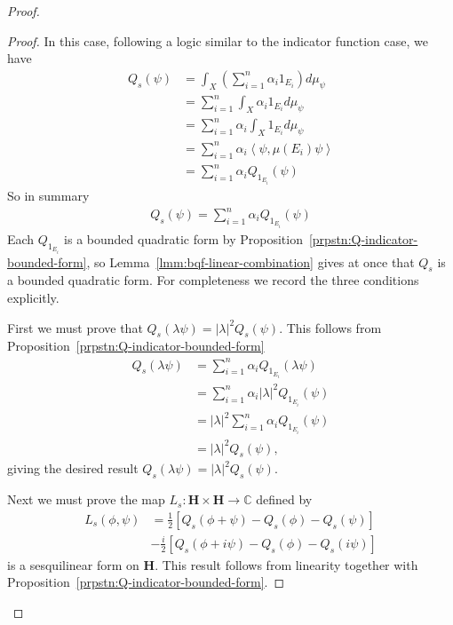 \begin{proof}
\begin{proof}
In this case, following a logic similar to the indicator function case, we have
\begin{align}
    Q_s(\psi) &= \int_X \left( \sum_{i = 1}^n \alpha_i 1_{E_i} \right) d\mu_\psi \\
              &= \sum_{i = 1}^n \int_X \alpha_i 1_{E_i} d\mu_\psi \\
              &= \sum_{i = 1}^n \alpha_i  \int_X 1_{E_i} d\mu_\psi \\
              &= \sum_{i = 1}^n \alpha_i  \left< \psi, \mu(E_i) \psi \right> \\
              &= \sum_{i = 1}^n \alpha_i  Q_{1_{E_i}}(\psi)
\end{align}
So in summary
\begin{align}
    Q_s(\psi) = \sum_{i = 1}^n \alpha_i  Q_{1_{E_i}}(\psi)
\end{align}
Each $Q_{1_{E_i}}$ is a bounded quadratic form by Proposition~\ref{prpstn:Q-indicator-bounded-form}, so Lemma~\ref{lmm:bqf-linear-combination} gives at once that $Q_s$ is a bounded quadratic form. For completeness we record the three conditions explicitly.

First we must prove that $Q_s(\lambda\psi) = \lvert\lambda\rvert^2 Q_s(\psi)$. This follows from Proposition~\ref{prpstn:Q-indicator-bounded-form}
\begin{align}
    Q_s(\lambda\psi) &= \sum_{i = 1}^n \alpha_i Q_{1_{E_i}}(\lambda\psi) \\
                     &= \sum_{i = 1}^n \alpha_i \lvert \lambda \rvert^2 Q_{1_{E_i}}(\psi) \\
                     &= \lvert \lambda \rvert^2 \sum_{i = 1}^n \alpha_i Q_{1_{E_i}}(\psi) \\
                     &= \lvert \lambda \rvert^2 Q_s(\psi),
\end{align}
giving the desired result $Q_s(\lambda\psi) = \lvert\lambda\rvert^2 Q_s(\psi)$.

Next we must prove the map $L_s : \mathbf{H} \times \mathbf{H} \rightarrow \mathbb{C}$ defined by
\begin{align}
    L_s(\phi, \psi) &= \frac{1}{2} \left[ Q_s(\phi + \psi) - Q_s(\phi) - Q_s(\psi) \right] \\
                    &-\frac{i}{2} \left[ Q_s(\phi + i\psi) - Q_s(\phi) - Q_s(i\psi) \right]
\end{align}
is a sesquilinear form on $\mathbf{H}$. This result follows from linearity together with Proposition~\ref{prpstn:Q-indicator-bounded-form}.


\end{proof}
\end{proof}
